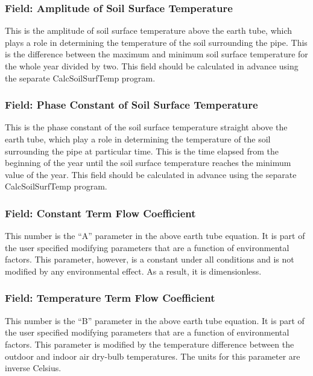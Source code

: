 \subsubsection{Field: Amplitude of Soil Surface Temperature}\label{field-amplitude-of-soil-surface-temperature}

This is the amplitude of soil surface temperature above the earth tube, which plays a role in determining the temperature of the soil surrounding the pipe. This is the difference between the maximum and minimum soil surface temperature for the whole year divided by two. This field should be calculated in advance using the separate CalcSoilSurfTemp program.

\subsubsection{Field: Phase Constant of Soil Surface Temperature}\label{field-phase-constant-of-soil-surface-temperature}

This is the phase constant of the soil surface temperature straight above the earth tube, which play a role in determining the temperature of the soil surrounding the pipe at particular time. This is the time elapsed from the beginning of the year until the soil surface temperature reaches the minimum value of the year. This field should be calculated in advance using the separate CalcSoilSurfTemp program.

\subsubsection{Field: Constant Term Flow Coefficient}\label{field-constant-term-flow-coefficient}

This number is the ``A'' parameter in the above earth tube equation. It is part of the user specified modifying parameters that are a function of environmental factors. This parameter, however, is a constant under all conditions and is not modified by any environmental effect. As a result, it is dimensionless.

\subsubsection{Field: Temperature Term Flow Coefficient}\label{field-temperature-term-flow-coefficient}

This number is the ``B'' parameter in the above earth tube equation. It is part of the user specified modifying parameters that are a function of environmental factors. This parameter is modified by the temperature difference between the outdoor and indoor air dry-bulb temperatures. The units for this parameter are inverse Celsius.

